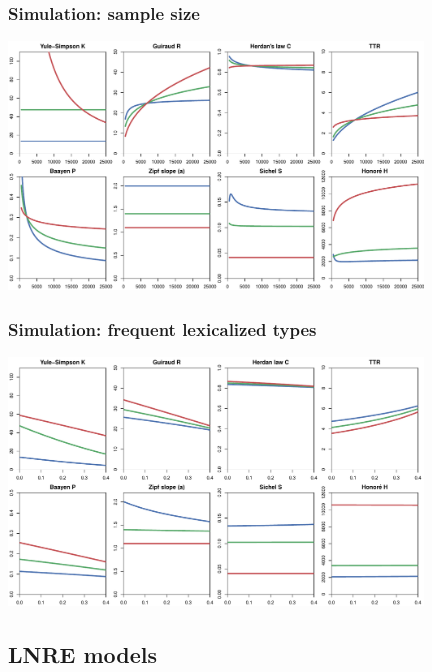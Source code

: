 \documentclass[handout,notes=show,t]{beamer} %
\begin{document}
\begin{frame}[c]
  \frametitle{Simulation: sample size}

  \centering
  \includegraphics[width=11cm]{img/lexconst_sample_size}
\end{frame}

\begin{frame}[c]
  \frametitle{Simulation: frequent lexicalized types}

  \centering
  \includegraphics[width=11cm]{img/lexconst_echo_type}
\end{frame}

\subsection{LNRE models}
\end{document}
